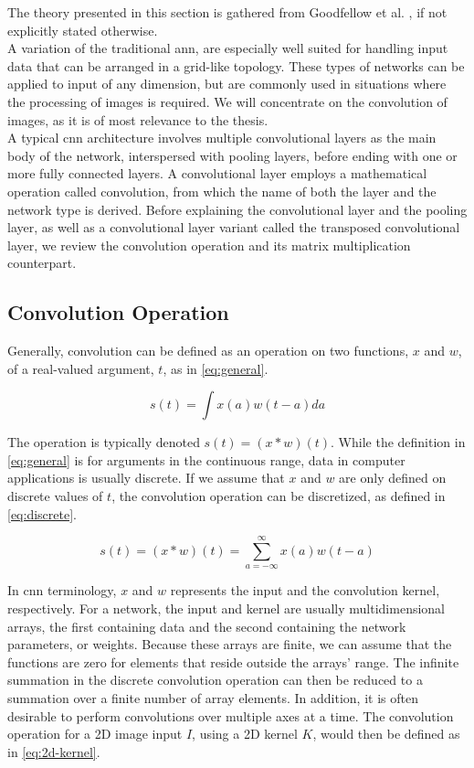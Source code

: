 The theory presented in this section is gathered from Goodfellow et al. \cite{conv-net-book}, if not explicitly stated otherwise. \\

\noindent A variation of the traditional \acrshort{ann},  are especially well suited for handling input data that can be arranged in a grid-like topology. These types of networks can be applied to input of any dimension, but are commonly used in situations where the processing of images is required. We will concentrate on the convolution of images, as it is of most relevance to the thesis. \\

\noindent A typical \acrshort{cnn} architecture involves multiple convolutional layers as the main body of the network, interspersed with pooling layers, before ending with one or more fully connected layers. A convolutional layer employs a mathematical operation called convolution, from which the name of both the layer and the network type is derived. Before explaining the convolutional layer and the pooling layer, as well as a convolutional layer variant called the transposed convolutional layer, we review the convolution operation and its matrix multiplication counterpart.

\subsection{Convolution Operation}

Generally, convolution can be defined as an operation on two functions, $x$ and $w$, of a real-valued argument, $t$, as in \autoref{eq:general}.

\begin{equation}
\label{eq:general}  
s(t) = \int x(a)w(t-a) da
\end{equation} 

\noindent The operation is typically denoted $s(t) = (x*w)(t)$. While the definition in \autoref{eq:general} is for arguments in the continuous range, data in computer applications is usually discrete. If we assume that $x$ and $w$ are only defined on discrete values of $t$, the convolution operation can be discretized, as defined in \autoref{eq:discrete}.

\begin{equation}
\label{eq:discrete}
s(t) = (x*w)(t) = \sum_{a=-\infty}^{\infty} x(a)w(t-a)
\end{equation} 

\noindent In \acrshort{cnn} terminology, $x$ and $w$ represents the input and the convolution kernel, respectively. For a network, the input and kernel are usually multidimensional arrays, the first containing data and the second containing the network parameters, or weights. Because these arrays are finite, we can assume that the functions are zero for elements that reside outside the arrays' range. The infinite summation in the discrete convolution operation can then be reduced to a summation over a finite number of array elements. In addition, it is often desirable to perform convolutions over multiple axes at a time. The convolution operation for a 2D image input $I$, using a 2D kernel $K$, would then be defined as in \autoref{eq:2d-kernel}.

